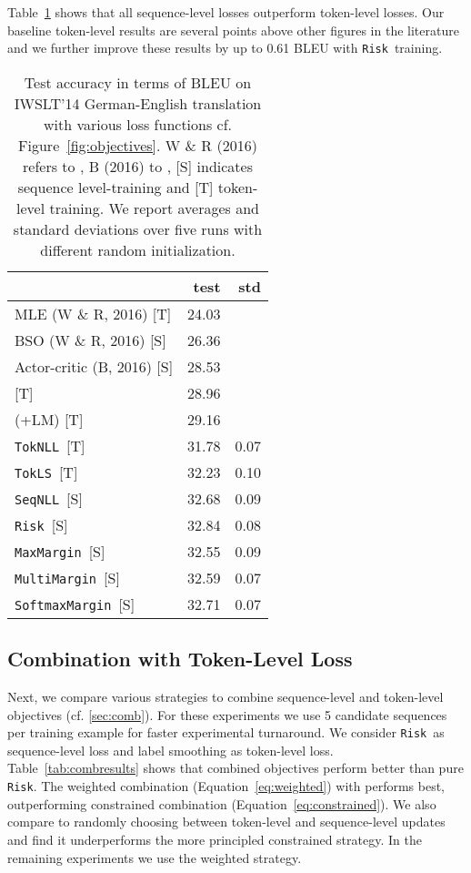 \documentclass[11pt,a4paper]{article}
\newcommand{\TokNLL}{\texttt{TokNLL}}
\newcommand{\TokLS}{\texttt{TokLS}}
\newcommand{\SeqNLL}{\texttt{SeqNLL}}
\newcommand{\Risk}{\texttt{Risk}}
\newcommand{\MaxMargin}{\texttt{MaxMargin}}
\newcommand{\MultiMargin}{\texttt{MultiMargin}}
\newcommand{\SoftmaxMargin}{\texttt{SoftmaxMargin}}
\begin{document}
Table~\ref{tab:seqresults} shows that all sequence-level losses outperform token-level losses.
Our baseline token-level results are several points above other figures in the literature and we further improve these results by up to 0.61 BLEU with \Risk~training.

\begin{table}[t]
\centering
\begin{tabular}{lrr}
\toprule
& \bf test & \bf std \\ \midrule
MLE (W \& R, 2016) [T] & 24.03 \\
BSO (W \& R, 2016) [S] & 26.36 \\ 
Actor-critic (B, 2016) [S] & 28.53 \\
\citet{huang2017npbmt} [T] & 28.96 \\
\citet{huang2017npbmt} (+LM) [T] & 29.16 \\ 
\midrule
\TokNLL~[T] & 31.78 & 0.07 \\
\TokLS~[T] & 32.23 & 0.10 \\ \midrule
\SeqNLL~[S] & 32.68 & 0.09 \\
\Risk~[S] & 32.84 & 0.08 \\
\MaxMargin~[S] & 32.55 & 0.09  \\
\MultiMargin~[S] & 32.59 & 0.07 \\
\SoftmaxMargin~[S] & 32.71 & 0.07 \\
\bottomrule
\end{tabular}
\caption{Test accuracy in terms of BLEU on IWSLT'14 German-English translation with various loss functions cf. Figure~\ref{fig:objectives}.
W \& R (2016) refers to \citet{wiseman2016acl}, B (2016) to \citet{bahdanau2016ac},
[S] indicates sequence level-training and [T] token-level training. We report averages and standard deviations over five runs with different random initialization. 
}
\label{tab:seqresults}
\end{table}



\subsection{Combination with Token-Level Loss}
\label{sec:results_comb}

Next, we compare various strategies to combine sequence-level and token-level objectives (cf. \textsection\ref{sec:comb}).
For these experiments we use 5 candidate sequences per training example for faster experimental turnaround.
We consider \Risk~as sequence-level loss and label smoothing as token-level loss.
Table~\ref{tab:combresults} shows that combined objectives perform better than pure \Risk.
The weighted combination (Equation~\ref{eq:weighted}) with  performs best, outperforming constrained combination (Equation~\ref{eq:constrained}).
We also compare to randomly choosing between token-level and sequence-level updates and find it underperforms the more principled constrained strategy.
In the remaining experiments we use the weighted strategy.
\end{document}
